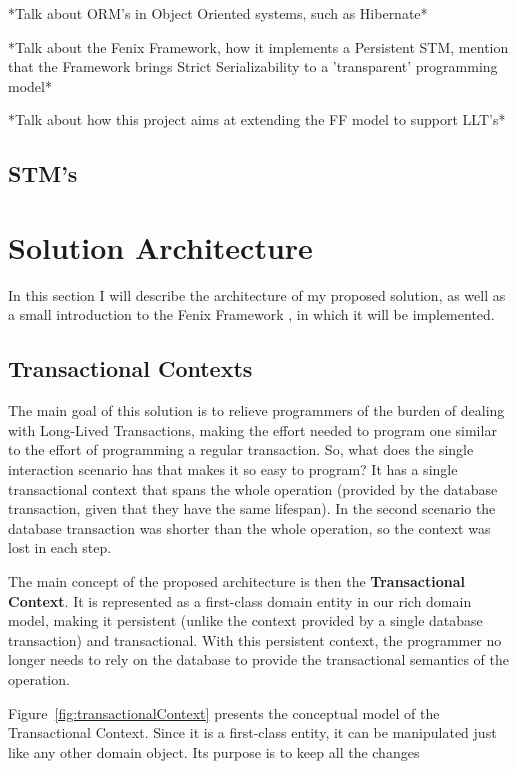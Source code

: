 \documentclass{llncs}
\begin{document}
*Talk about ORM's in Object Oriented systems, such as Hibernate*

*Talk about the Fenix Framework, how it implements a Persistent STM,
mention that the Framework brings Strict Serializability to a
'transparent' programming model* \cite{fernandes2011strict} 
\cite{guerraoui2008correctness} \cite{cachopo2006versioned}

*Talk about how this project aims at extending the FF model to support LLT's*

\subsection{STM's}
\label{sec:stm}


\section{Solution Architecture}

In this section I will describe the architecture of my proposed
solution, as well as a small introduction to the Fenix Framework
\cite{fernandes2011strict}, in which it will be implemented.

\subsection{Transactional Contexts}

The main goal of this solution is to relieve programmers of the burden
of dealing with Long-Lived Transactions, making the effort needed to
program one similar to the effort of programming a regular
transaction. So, what does the single interaction scenario has that
makes it so easy to program? It has a single transactional context
that spans the whole operation (provided by the database transaction,
given that they have the same lifespan). In the second scenario the
database transaction was shorter than the whole operation, so the
context was lost in each step.

The main concept of the proposed architecture is then the {\bf
  Transactional Context}. It is represented as a first-class domain entity in our
rich domain model, making it persistent (unlike the context provided
by a single database transaction) and transactional. With this
persistent context, the programmer no longer needs to rely on the
database to provide the transactional semantics of the operation. 

Figure~\ref{fig:transactionalContext} presents the conceptual model of the
Transactional Context. Since it is a first-class entity, it can be
manipulated just like any other domain object. Its purpose is to keep
all the changes 
\end{document}
